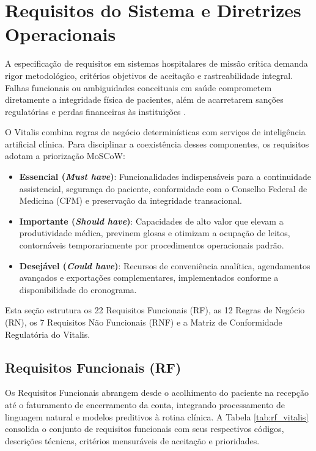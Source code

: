 \section{Requisitos do Sistema e Diretrizes Operacionais}
\label{sec:requisitos}

A especificação de requisitos em sistemas hospitalares de missão crítica demanda rigor metodológico, critérios objetivos de aceitação e rastreabilidade integral. Falhas funcionais ou ambiguidades conceituais em saúde comprometem diretamente a integridade física de pacientes, além de acarretarem sanções regulatórias e perdas financeiras às instituições \cite{sommerville:2019, pressman:2016}.

O Vitalis combina regras de negócio determinísticas com serviços de inteligência artificial clínica. Para disciplinar a coexistência desses componentes, os requisitos adotam a priorização MoSCoW:
\begin{itemize}[leftmargin=*]
    \item \textbf{Essencial (\textit{Must have})}: Funcionalidades indispensáveis para a continuidade assistencial, segurança do paciente, conformidade com o Conselho Federal de Medicina (CFM) \cite{cfm_prontuario:2007, cfm_digital:2021} e preservação da integridade transacional.
    \item \textbf{Importante (\textit{Should have})}: Capacidades de alto valor que elevam a produtividade médica, previnem glosas e otimizam a ocupação de leitos, contornáveis temporariamente por procedimentos operacionais padrão.
    \item \textbf{Desejável (\textit{Could have})}: Recursos de conveniência analítica, agendamentos avançados e exportações complementares, implementados conforme a disponibilidade do cronograma.
\end{itemize}

Esta seção estrutura os 22 Requisitos Funcionais (RF), as 12 Regras de Negócio (RN), os 7 Requisitos Não Funcionais (RNF) e a Matriz de Conformidade Regulatória do Vitalis.

\subsection{Requisitos Funcionais (RF)}

Os Requisitos Funcionais abrangem desde o acolhimento do paciente na recepção até o faturamento de encerramento da conta, integrando processamento de linguagem natural e modelos preditivos à rotina clínica. A Tabela \ref{tab:rf_vitalis} consolida o conjunto de requisitos funcionais com seus respectivos códigos, descrições técnicas, critérios mensuráveis de aceitação e prioridades.

